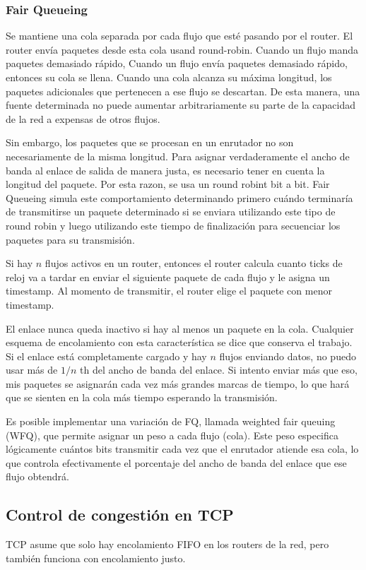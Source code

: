\subsubsection{Fair Queueing}
Se mantiene una cola separada por cada flujo que esté pasando por el router. El router envía paquetes desde esta cola usand round-robin. Cuando un flujo manda paquetes demasiado rápido, Cuando un flujo envía paquetes demasiado rápido, entonces su cola se llena. Cuando una cola alcanza su máxima longitud, los paquetes adicionales que pertenecen a ese flujo se descartan. De esta manera, una fuente determinada no puede aumentar arbitrariamente su parte de la capacidad de la red a expensas de otros flujos.

Sin embargo, los paquetes que se procesan en un enrutador no son necesariamente de la misma longitud. Para asignar verdaderamente el ancho de banda al enlace de salida de manera justa, es necesario tener en cuenta la longitud del paquete. Por esta razon, se usa un round robint bit a bit. Fair Queueing simula este comportamiento determinando primero cuándo terminaría de transmitirse un paquete determinado si se enviara utilizando este tipo de round robin y luego utilizando este tiempo de finalización para secuenciar los paquetes para su transmisión.

Si hay \(n\) flujos activos en un router, entonces el router calcula cuanto ticks de reloj va a tardar en enviar el siguiente paquete de cada flujo y le asigna un timestamp. Al momento de transmitir, el router elige el paquete con menor timestamp.

El enlace nunca queda inactivo si hay al menos un paquete en la cola. Cualquier esquema de encolamiento con esta característica se dice que conserva el trabajo. Si el enlace está completamente cargado y hay \(n\) flujos enviando datos, no puedo usar más de \(1/n\) th del ancho de banda del enlace. Si intento enviar más que eso, mis paquetes se asignarán cada vez más grandes marcas de tiempo, lo que hará que se sienten en la cola más tiempo esperando la transmisión.

Es posible implementar una variación de FQ, llamada weighted fair queuing (WFQ), que permite asignar un peso a cada flujo (cola). Este peso especifica lógicamente cuántos bits transmitir cada vez que el enrutador atiende esa cola, lo que controla efectivamente el porcentaje del ancho de banda del enlace que ese flujo obtendrá.

\subsection{Control de congestión en TCP}
TCP asume que solo hay encolamiento FIFO en los routers de la red, pero también funciona con encolamiento justo.

